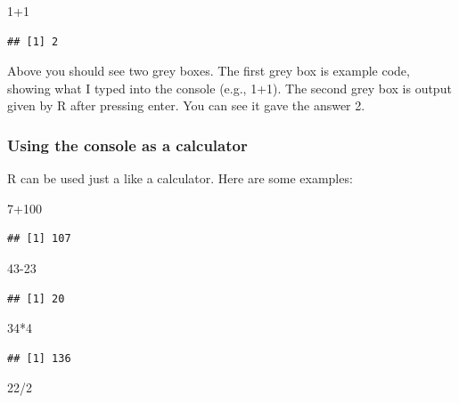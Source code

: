\documentclass[]{book}
\newenvironment{Shaded}{\begin{snugshade}}{\end{snugshade}}
\newcommand{\DecValTok}[1]{\textcolor[rgb]{0.00,0.00,0.81}{{#1}}}
\newcommand{\NormalTok}[1]{{#1}}
\theoremstyle{definition}
\theoremstyle{definition}
\theoremstyle{definition}
\theoremstyle{remark}
\begin{document}
\begin{Shaded}
\begin{Highlighting}[]
\DecValTok{1+1}
\end{Highlighting}
\end{Shaded}

\begin{verbatim}
## [1] 2
\end{verbatim}

Above you should see two grey boxes. The first grey box is example code,
showing what I typed into the console (e.g., 1+1). The second grey box
is output given by R after pressing enter. You can see it gave the
answer 2.

\subsubsection{Using the console as a
calculator}\label{using-the-console-as-a-calculator}

R can be used just a like a calculator. Here are some examples:

\begin{Shaded}
\begin{Highlighting}[]
\DecValTok{7+100}
\end{Highlighting}
\end{Shaded}

\begin{verbatim}
## [1] 107
\end{verbatim}

\begin{Shaded}
\begin{Highlighting}[]
\DecValTok{43-23}
\end{Highlighting}
\end{Shaded}

\begin{verbatim}
## [1] 20
\end{verbatim}

\begin{Shaded}
\begin{Highlighting}[]
\DecValTok{34}\NormalTok{*}\DecValTok{4}
\end{Highlighting}
\end{Shaded}

\begin{verbatim}
## [1] 136
\end{verbatim}

\begin{Shaded}
\begin{Highlighting}[]
\DecValTok{22}\NormalTok{/}\DecValTok{2}
\end{Highlighting}
\end{Shaded}
\end{document}
